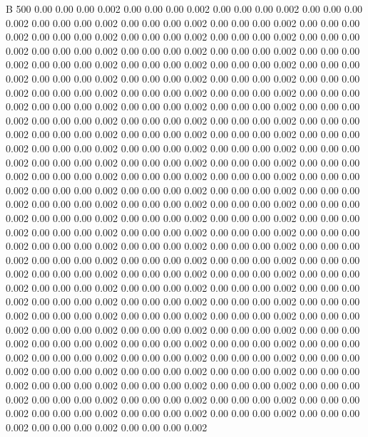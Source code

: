 


B    500
0.00 0.00 0.00 0.002
0.00 0.00 0.00 0.002
0.00 0.00 0.00 0.002
0.00 0.00 0.00 0.002
0.00 0.00 0.00 0.002
0.00 0.00 0.00 0.002
0.00 0.00 0.00 0.002
0.00 0.00 0.00 0.002
0.00 0.00 0.00 0.002
0.00 0.00 0.00 0.002
0.00 0.00 0.00 0.002
0.00 0.00 0.00 0.002
0.00 0.00 0.00 0.002
0.00 0.00 0.00 0.002
0.00 0.00 0.00 0.002
0.00 0.00 0.00 0.002
0.00 0.00 0.00 0.002
0.00 0.00 0.00 0.002
0.00 0.00 0.00 0.002
0.00 0.00 0.00 0.002
0.00 0.00 0.00 0.002
0.00 0.00 0.00 0.002
0.00 0.00 0.00 0.002
0.00 0.00 0.00 0.002
0.00 0.00 0.00 0.002
0.00 0.00 0.00 0.002
0.00 0.00 0.00 0.002
0.00 0.00 0.00 0.002
0.00 0.00 0.00 0.002
0.00 0.00 0.00 0.002
0.00 0.00 0.00 0.002
0.00 0.00 0.00 0.002
0.00 0.00 0.00 0.002
0.00 0.00 0.00 0.002
0.00 0.00 0.00 0.002
0.00 0.00 0.00 0.002
0.00 0.00 0.00 0.002
0.00 0.00 0.00 0.002
0.00 0.00 0.00 0.002
0.00 0.00 0.00 0.002
0.00 0.00 0.00 0.002
0.00 0.00 0.00 0.002
0.00 0.00 0.00 0.002
0.00 0.00 0.00 0.002
0.00 0.00 0.00 0.002
0.00 0.00 0.00 0.002
0.00 0.00 0.00 0.002
0.00 0.00 0.00 0.002
0.00 0.00 0.00 0.002
0.00 0.00 0.00 0.002
0.00 0.00 0.00 0.002
0.00 0.00 0.00 0.002
0.00 0.00 0.00 0.002
0.00 0.00 0.00 0.002
0.00 0.00 0.00 0.002
0.00 0.00 0.00 0.002
0.00 0.00 0.00 0.002
0.00 0.00 0.00 0.002
0.00 0.00 0.00 0.002
0.00 0.00 0.00 0.002
0.00 0.00 0.00 0.002
0.00 0.00 0.00 0.002
0.00 0.00 0.00 0.002
0.00 0.00 0.00 0.002
0.00 0.00 0.00 0.002
0.00 0.00 0.00 0.002
0.00 0.00 0.00 0.002
0.00 0.00 0.00 0.002
0.00 0.00 0.00 0.002
0.00 0.00 0.00 0.002
0.00 0.00 0.00 0.002
0.00 0.00 0.00 0.002
0.00 0.00 0.00 0.002
0.00 0.00 0.00 0.002
0.00 0.00 0.00 0.002
0.00 0.00 0.00 0.002
0.00 0.00 0.00 0.002
0.00 0.00 0.00 0.002
0.00 0.00 0.00 0.002
0.00 0.00 0.00 0.002
0.00 0.00 0.00 0.002
0.00 0.00 0.00 0.002
0.00 0.00 0.00 0.002
0.00 0.00 0.00 0.002
0.00 0.00 0.00 0.002
0.00 0.00 0.00 0.002
0.00 0.00 0.00 0.002
0.00 0.00 0.00 0.002
0.00 0.00 0.00 0.002
0.00 0.00 0.00 0.002
0.00 0.00 0.00 0.002
0.00 0.00 0.00 0.002
0.00 0.00 0.00 0.002
0.00 0.00 0.00 0.002
0.00 0.00 0.00 0.002
0.00 0.00 0.00 0.002
0.00 0.00 0.00 0.002
0.00 0.00 0.00 0.002
0.00 0.00 0.00 0.002
0.00 0.00 0.00 0.002
0.00 0.00 0.00 0.002
0.00 0.00 0.00 0.002
0.00 0.00 0.00 0.002
0.00 0.00 0.00 0.002
0.00 0.00 0.00 0.002
0.00 0.00 0.00 0.002
0.00 0.00 0.00 0.002
0.00 0.00 0.00 0.002
0.00 0.00 0.00 0.002
0.00 0.00 0.00 0.002
0.00 0.00 0.00 0.002
0.00 0.00 0.00 0.002
0.00 0.00 0.00 0.002
0.00 0.00 0.00 0.002
0.00 0.00 0.00 0.002
0.00 0.00 0.00 0.002
0.00 0.00 0.00 0.002
0.00 0.00 0.00 0.002
0.00 0.00 0.00 0.002
0.00 0.00 0.00 0.002
0.00 0.00 0.00 0.002
0.00 0.00 0.00 0.002
